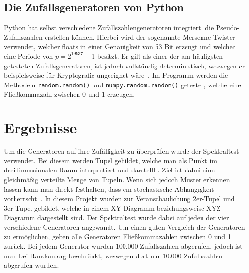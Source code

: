\documentclass[12pt]{article}
\begin{document}
    \subsection{Die Zufallsgeneratoren von Python}\label{subsec:die-zufallsgeneratoren-von-python}
    Python hat selbst verschiedene Zufallszahlengeneratoren integriert, die Pseudo-Zufallszahlen erstellen können.
    Hierbei wird der sogenannte Mersenne-Twister verwendet, welcher floats in einer Genauigkeit von 53 Bit erzeugt und welcher
    eine Periode von $p=2^{19937}-1$ besitzt.
    Er gilt als einer der am häufigsten getesteten Zufallsgeneratoren, ist jedoch vollständig deterministisch,
    weswegen er beispielsweise für Kryptografie ungeeignet wäre~\cite{python-random,mersenne-twister}.
    Im Programm werden die Methodem \texttt{random.random()} und \texttt{numpy.random.random()} getestet,
    welche eine Fließkommazahl zwischen 0 und 1 erzeugen.



    \section{Ergebnisse}\label{sec:Ergebnisse}
    Um die Generatoren auf ihre Zufälligkeit zu überprüfen wurde der Spektraltest verwendet.
    Bei diesem werden Tupel gebildet, welche man als Punkt im dreidimensionalen Raum interpretiert und darstelllt.
    Ziel ist dabei eine gleichmäßig verteilte Menge von Tupeln.
    Wenn sich jedoch Muster erkennen lassen kann man direkt festhalten, dass ein stochastische Abhängigkeit vorherrscht~\cite{spektraltest}.
    In diesem Projekt wurden zur Veranschaulichung 2er-Tupel und 3er-Tupel gebildet,
    welche in einem XY-Diagramm beziehungsweise XYZ-Diagramm dargestellt sind.
    Der Spektraltest wurde dabei auf jeden der vier verschiedene Generatoren angewandt.
    Um einen guten Vergleich der Generatoren zu ermöglichen, geben alle Generatoren Fließkommazahlen zwischen 0 und 1 zurück.
    Bei jedem Generator wurden 100.000 Zufallszahlen abgerufen, jedoch ist man bei Random.org beschränkt,
    weswegen dort nur 10.000 Zufallszahlen abgerufen wurden.
\end{document}
